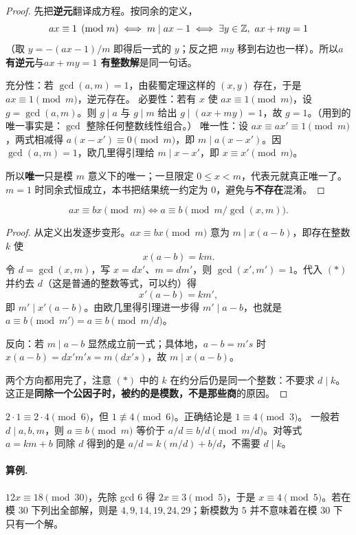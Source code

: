 \begin{proof}
先把\textbf{逆元}翻译成方程。按同余的定义，
\[
 ax\equiv1\pmod m\iff m\mid ax-1\iff \exists y\in\mathbb Z,\ ax+my=1
\]
（取 $y=-(ax-1)/m$ 即得后一式的 $y$；反之把 $my$ 移到右边也一样）。所以\textbf{$a$ 有逆元}与\textbf{$ax+my=1$ 有整数解}是同一句话。

充分性：若 $\gcd(a,m)=1$，由裴蜀定理这样的 $(x,y)$ 存在，于是 $ax\equiv1\pmod m$，逆元存在。
必要性：若有 $x$ 使 $ax\equiv1\pmod m$，设 $g=\gcd(a,m)$。则 $g\mid a$ 与 $g\mid m$ 给出 $g\mid(ax+my)=1$，故 $g=1$。（用到的唯一事实是：$\gcd$ 整除任何整数线性组合。）
唯一性：设 $ax\equiv ax'\equiv1\pmod m$，两式相减得 $a(x-x')\equiv0\pmod m$，即 $m\mid a(x-x')$。因 $\gcd(a,m)=1$，欧几里得引理给 $m\mid x-x'$，即 $x\equiv x'\pmod m$。

所以\textbf{唯一}只是模 $m$ 意义下的唯一；一旦限定 $0\le x<m$，代表元就真正唯一了。$m=1$ 时同余式恒成立，本书把结果统一约定为 $0$，避免与\textbf{不存在}混淆。
\end{proof}
\begin{theorem}[约分后模数的变化]
\[
 ax\equiv bx\pmod m
 \iff a\equiv b\pmod{m/\gcd(x,m)}.
\]
\end{theorem}
\begin{proof}
从定义出发逐步变形。$ax\equiv bx\pmod m$ 意为 $m\mid x(a-b)$，即存在整数 $k$ 使
\[
 x(a-b)=km. \tag{$\ast$}
\]
令 $d=\gcd(x,m)$，写 $x=dx'$、$m=dm'$，则 $\gcd(x',m')=1$。代入 $(\ast)$ 并约去 $d$（这是普通的整数等式，可以约）得
\[
 x'(a-b)=km',
\]
即 $m'\mid x'(a-b)$。由欧几里得引理进一步得 $m'\mid a-b$，也就是 $a\equiv b\pmod{m'}=a\equiv b\pmod{m/d}$。

反向：若 $m\mid a-b$ 显然成立前一式；具体地，$a-b=m's$ 时 $x(a-b)=dx'm's=m(dx's)$，故 $m\mid x(a-b)$。

两个方向都用完了，注意 $(\ast)$ 中的 $k$ 在约分后仍是同一个整数：不要求 $d\mid k$。这正是\textbf{同除一个公因子时，被约的是模数，不是那些商}的原因。
\end{proof}

\begin{pitfall}[把整数除法直接搬到同余式中会出错]
$2\cdot1\equiv2\cdot4\pmod6$，但 $1\not\equiv4\pmod6$。正确结论是 $1\equiv4\pmod3$。
一般若 $d\mid a,b,m$，则 $a\equiv b\pmod m$ 等价于 $a/d\equiv b/d\pmod{m/d}$。对等式 $a=km+b$ 同除 $d$ 得到的是 $a/d=k(m/d)+b/d$，不需要 $d\mid k$。
\end{pitfall}
\paragraph{算例.} $12x\equiv18\pmod{30}$，先除 gcd $6$ 得 $2x\equiv3\pmod5$，于是 $x\equiv4\pmod5$。若在模 $30$ 下列出全部解，则是 $4,9,14,19,24,29$；新模数为 $5$ 并不意味着在模 $30$ 下只有一个解。


